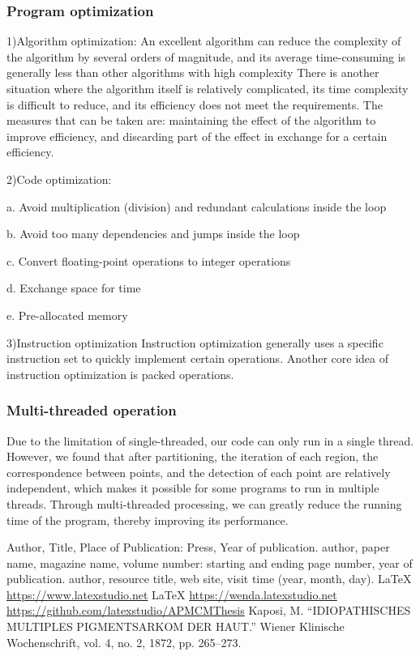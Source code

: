\documentclass{apmcmthesis}
\begin{document}
\subsubsection{Program optimization}
1)Algorithm optimization:
An excellent algorithm can reduce the complexity of the algorithm by several orders of magnitude, and its average time-consuming is generally less than other algorithms with high complexity
There is another situation where the algorithm itself is relatively complicated, its time complexity is difficult to reduce, and its efficiency does not meet the requirements. The measures that can be taken are: maintaining the effect of the algorithm to improve efficiency, and discarding part of the effect in exchange for a certain efficiency.


2)Code optimization:


a. Avoid multiplication (division) and redundant calculations inside the loop


b. Avoid too many dependencies and jumps inside the loop


c. Convert floating-point operations to integer operations


d. Exchange space for time


e. Pre-allocated memory


3)Instruction optimization
Instruction optimization generally uses a specific instruction set to quickly implement certain operations. Another core idea of instruction optimization is packed operations.

\subsubsection{Multi-threaded operation}
Due to the limitation of single-threaded, our code can only run in a single thread. However, we found that after partitioning, the iteration of each region, the correspondence between points, and the detection of each point are relatively independent, which makes it possible for some programs to run in multiple threads. Through multi-threaded processing, we can greatly reduce the running time of the program, thereby improving its performance.




\begin{thebibliography}{9}%
   Author, Title, Place of Publication: Press, Year of publication.
   author, paper name, magazine name, volume number: starting and ending
  page number, year of publication.
   author, resource title, web site, visit time (year, month, day).
   \LaTeX{} \url{https://www.latexstudio.net}
   \LaTeX{} \url{https://wenda.latexstudio.net}
    \url{https://github.com/latexstudio/APMCMThesis}
   Kaposi, M. “IDIOPATHISCHES MULTIPLES PIGMENTSARKOM DER HAUT.” Wiener Klinische Wochenschrift, vol. 4, no. 2, 1872, pp. 265–273.
\end{thebibliography}
\end{document}
